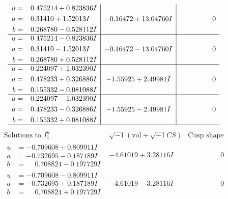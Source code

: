 \documentclass[1p]{elsarticle_modified}
\theoremstyle{definition}
\newcommand{\I}{\sqrt{-1}}
\begin{document}
$$\begin{array}{c|c|c}
\begin{aligned}
u &= \phantom{-}0.475214 + 0.823836 I \\
a &= \phantom{-}0.31410 + 1.52013 I \\
b &= \phantom{-}0.268780 - 0.528112 I\end{aligned}
 & -0.16472 + 13.04760 I & \phantom{-0.000000 } 0 \\ \hline\begin{aligned}
u &= \phantom{-}0.475214 - 0.823836 I \\
a &= \phantom{-}0.31410 - 1.52013 I \\
b &= \phantom{-}0.268780 + 0.528112 I\end{aligned}
 & -0.16472 - 13.04760 I & \phantom{-0.000000 } 0 \\ \hline\begin{aligned}
u &= \phantom{-}0.224097 + 1.032390 I \\
a &= \phantom{-}0.478233 + 0.326886 I \\
b &= \phantom{-}0.155332 - 0.081088 I\end{aligned}
 & -1.55925 + 2.49981 I & \phantom{-0.000000 } 0 \\ \hline\begin{aligned}
u &= \phantom{-}0.224097 - 1.032390 I \\
a &= \phantom{-}0.478233 - 0.326886 I \\
b &= \phantom{-}0.155332 + 0.081088 I\end{aligned}
 & -1.55925 - 2.49981 I & \phantom{-0.000000 } 0\\
 \hline 
 \end{array}$$\newpage$$\begin{array}{c|c|c}  
\text{Solutions to }I^u_{1}& \I (\text{vol} + \sqrt{-1}CS) & \text{Cusp shape}\\
 \hline 
\begin{aligned}
u &= -0.709608 + 0.809911 I \\
a &= -0.732695 - 0.187189 I \\
b &= \phantom{-}0.708824 - 0.197729 I\end{aligned}
 & -4.61019 + 3.28116 I & \phantom{-0.000000 } 0 \\ \hline\begin{aligned}
u &= -0.709608 - 0.809911 I \\
a &= -0.732695 + 0.187189 I \\
b &= \phantom{-}0.708824 + 0.197729 I\end{aligned}
 & -4.61019 - 3.28116 I & \phantom{-0.000000 } 0 \\ \hline\begin{aligned}

\end{aligned}
\end{array}$$
\end{document}
